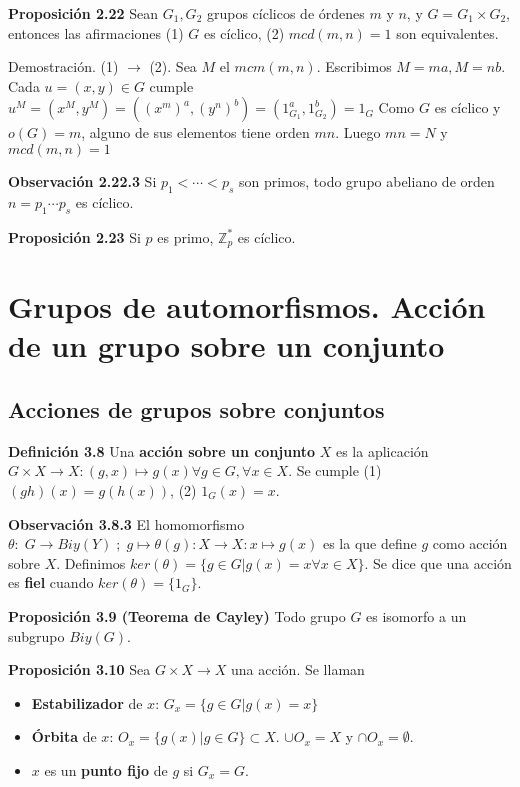 \documentclass[a4paper, 11pt]{extarticle}
\newcommand{\propo}[1]{\textcolor{rojo}{\textbf{Proposición #1}}}
\newcommand{\defi}[1]{\textcolor{azul}{\textbf{Definición #1}}}
\newcommand{\obs}[1]{\textcolor{verde}{\textbf{Observación #1}}}
\newcommand{\dem}[1]{\textcolor{gris}{\small{Demostración. #1}}}
\begin{document}
\propo{2.22} Sean \(G_1, G_2\) grupos cíclicos de órdenes \(m\) y \(n\), y 
\(G = G_1 \times G_2\), entonces las afirmaciones (1) \(G\) es cíclico, (2) \(mcd(m,n) = 1\) son
equivalentes.

\dem{ (1) $\rightarrow$ (2). Sea \( M \) el \( mcm(m,n) \). Escribimos \( M=ma, M=nb \).
 Cada \( u=(x,y) \in G \) cumple \( u^M = (x^M, y^M) = ((x^m)^a, (y^n)^b) = (1_{G_1}^a, 1_{G_2}^b) = 1_G \)
 Como \( G \) es cíclico y \( o(G) = m \), alguno de sus elementos tiene orden \( mn \). Luego \( mn=N \) y \( mcd(m,n) = 1\)   }


\obs{2.22.3} Si \(p_1 < \cdots < p_s\) son primos, todo grupo abeliano de
orden \(n = p_1 \cdots p_s\) es cíclico.

\propo{2.23} Si \(p\) es primo, \(\mathbb{Z}_p^*\) es cíclico.

\section*{Grupos de automorfismos. Acción de un grupo sobre un conjunto}
\label{sec:org1225575}
\subsection*{Acciones de grupos sobre conjuntos}
\label{sec:org85db9f4}
\defi{3.8} Una \textbf{acción sobre un conjunto} \(X\) es la aplicación \(G \times
   X \rightarrow X: (g,x) \mapsto g(x) \forall g \in G, \forall x \in X\). Se
cumple (1) \((gh)(x) = g(h(x))\), (2) \(1_G(x) = x\).

\obs{3.8.3} El homomorfismo \(\theta: \; G \longrightarrow Biy(Y) \;;\; g
   \mapsto \theta(g): X \rightarrow X: x \mapsto g(x)\) es la que define \(g\) como acción sobre \(X\). Definimos \(ker(\theta) = \{ g \in G | g(x) = x \forall x \in X \}\). Se dice que una
acción es \textbf{fiel} cuando \(ker (\theta) = \{ 1_G \}\).

\propo{3.9 (Teorema de Cayley)} Todo grupo \(G\) es isomorfo a un subgrupo \(Biy(G)\).

\propo{3.10} Sea \(G \times X \rightarrow X\) una acción. Se llaman
\begin{itemize}
\item \textbf{Estabilizador} de \(x\): \(G_x = \{ g \in G| g(x) = x \}\)
\item \textbf{Órbita} de \(x\): \(O_x = \{ g(x) | g \in G \} \subset X\). \(\cup O_x = X\) y \(\cap
  O_x = \emptyset\).
\item \(x\) es un \textbf{punto fijo} de \(g\) si \(G_x = G\).
\end{itemize}
\end{document}
